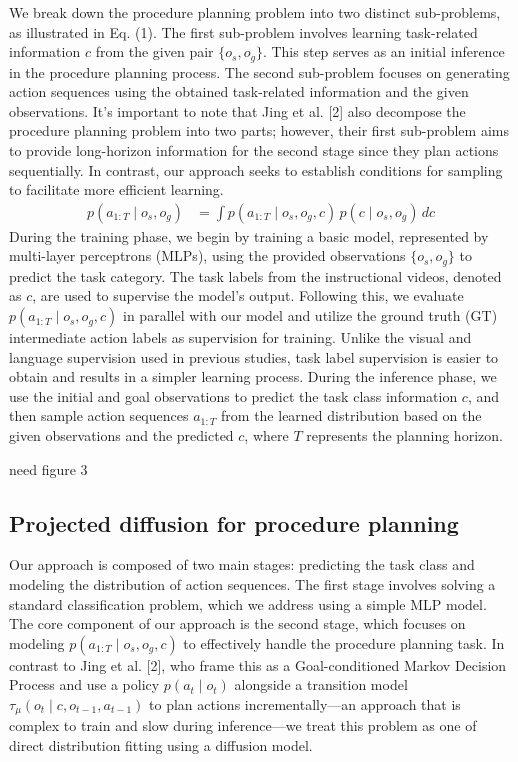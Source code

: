 \documentclass{article} %
\begin{document}
We break down the procedure planning problem into two distinct sub-problems, as illustrated in Eq. (1). The first sub-problem involves learning task-related information \(c\) from the given pair \(\{o_s, o_g\}\). This step serves as an initial inference in the procedure planning process. The second sub-problem focuses on generating action sequences using the obtained task-related information and the given observations. It's important to note that Jing et al. [2] also decompose the procedure planning problem into two parts; however, their first sub-problem aims to provide long-horizon information for the second stage since they plan actions sequentially. In contrast, our approach seeks to establish conditions for sampling to facilitate more efficient learning.
\begin{equation}
     \begin{aligned}
          p\left(a_{1:T} \mid o_s, o_g\right) & = \int p\left(a_{1:T} \mid o_s, o_g, c\right) \, p\left(c \mid o_s, o_g\right) \, dc
     \end{aligned}
\end{equation}
During the training phase, we begin by training a basic model, represented by multi-layer perceptrons (MLPs), using the provided observations \(\{o_s, o_g\}\) to predict the task category. The task labels from the instructional videos, denoted as \(c\), are used to supervise the model's output. Following this, we evaluate \(p(a_{1:T} \mid o_s, o_g, c)\) in parallel with our model and utilize the ground truth (GT) intermediate action labels as supervision for training. Unlike the visual and language supervision used in previous studies, task label supervision is easier to obtain and results in a simpler learning process. During the inference phase, we use the initial and goal observations to predict the task class information \(c\), and then sample action sequences \(a_{1:T}\) from the learned distribution based on the given observations and the predicted \(c\), where \(T\) represents the planning horizon.


need figure 3
\subsection{Projected diffusion for procedure planning}
Our approach is composed of two main stages: predicting the task class and modeling the distribution of action sequences. The first stage involves solving a standard classification problem, which we address using a simple MLP model. The core component of our approach is the second stage, which focuses on modeling \(p(a_{1:T} \mid o_s, o_g, c)\) to effectively handle the procedure planning task. In contrast to Jing et al. [2], who frame this as a Goal-conditioned Markov Decision Process and use a policy \(p(a_t \mid o_t)\) alongside a transition model \(\tau_\mu(o_t \mid c, o_{t-1}, a_{t-1})\) to plan actions incrementally—an approach that is complex to train and slow during inference—we treat this problem as one of direct distribution fitting using a diffusion model.
\end{document}
